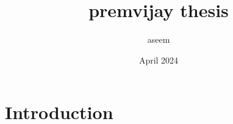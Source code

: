 \documentclass{article}
\title{premvijay thesis}
\author{aseem }
\date{April 2024}
\begin{document}
\maketitle

\section{Introduction}
\end{document}
